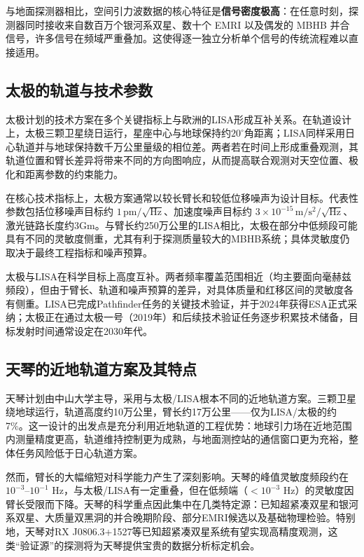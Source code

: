 与地面探测器相比，空间引力波数据的核心特征是\textbf{信号密度极高}：在任意时刻，探测器同时接收来自数百万个银河系双星、数十个 EMRI 以及偶发的 MBHB 并合信号，许多信号在频域严重叠加。这使得逐一独立分析单个信号的传统流程难以直接适用。

\subsection{太极的轨道与技术参数}

太极计划的技术方案在多个关键指标上与欧洲的LISA形成互补关系。在轨道设计上，太极三颗卫星绕日运行，星座中心与地球保持约$20^\circ$角距离；LISA同样采用日心轨道并与地球保持数千万公里量级的相位差。两者若在时间上形成重叠观测，其轨道位置和臂长差异将带来不同的方向图响应，从而提高联合观测对天空位置、极化和距离参数的约束能力。

在核心技术指标上，太极方案通常以较长臂长和较低位移噪声为设计目标。代表性参数包括位移噪声目标约 $1\,\mathrm{pm}/\sqrt{\mathrm{Hz}}$、加速度噪声目标约 $3\times10^{-15}\,\mathrm{m/s^2}/\sqrt{\mathrm{Hz}}$、激光链路长度约3Gm。与臂长约250万公里的LISA相比，太极在部分中低频段可能具有不同的灵敏度侧重，尤其有利于探测质量较大的MBHB系统；具体灵敏度仍取决于最终工程指标和噪声预算。

太极与LISA在科学目标上高度互补。两者频率覆盖范围相近（均主要面向毫赫兹频段），但由于臂长、轨道和噪声预算的差异，对具体质量和红移区间的灵敏度各有侧重。LISA已完成Pathfinder任务的关键技术验证，并于2024年获得ESA正式采纳；太极正在通过太极一号（2019年）和后续技术验证任务逐步积累技术储备，目标发射时间通常设定在2030年代。

\subsection{天琴的近地轨道方案及其特点}

天琴计划由中山大学主导，采用与太极/LISA根本不同的近地轨道方案。三颗卫星绕地球运行，轨道高度约10万公里，臂长约17万公里——仅为LISA/太极的约7\%。这一设计的出发点是充分利用近地轨道的工程优势：地球引力场在近地范围内测量精度更高，轨道维持控制更为成熟，与地面测控站的通信窗口更为充裕，整体任务风险低于日心轨道方案。

然而，臂长的大幅缩短对科学能力产生了深刻影响。天琴的峰值灵敏度频段约在 $10^{-3}$--$10^{-1}$ Hz，与太极/LISA有一定重叠，但在低频端（$<10^{-3}$ Hz）的灵敏度因臂长受限而下降。天琴的科学重点因此集中在几类特定源：已知超紧凑双星和银河系双星、大质量双黑洞的并合晚期阶段、部分EMRI候选以及基础物理检验。特别地，天琴对RX J0806.3+1527等已知超紧凑双星系统有望实现高精度观测，这类“验证源”的探测将为天琴提供宝贵的数据分析标定机会。

